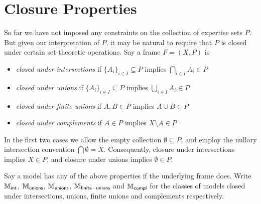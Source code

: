 \section{Closure Properties}
\label{exp_sec_closure_properties}

So far we have not imposed any constraints on the collection of expertise sets
$P$. But given our interpretation of $P$, it may be natural to
require that $P$ is closed under certain set-theoretic operations. Say
a frame $F = (X, P)$ is

\begin{itemize}

    \item \emph{closed under intersections} if $\{A_i\}_{i \in I} \subseteq P$
          implies $\bigcap_{i \in I}{A_i} \in P$

    \item \emph{closed under unions} if $\{A_i\}_{i \in I} \subseteq P$ implies
          $\bigcup_{i \in I}{A_i} \in P$

    \item \emph{closed under finite unions} if $A, B \in P$ implies $A \cup B
          \in P$

    \item \emph{closed under complements} if $A \in P$ implies $X \setminus A
          \in P$

\end{itemize}

In the first two cases we allow the empty collection $\emptyset \subseteq P$,
and employ the nullary intersection convention $\bigcap \emptyset = X$.
Consequently, closure under intersections implies $X \in P$, and closure under
unions implies $\emptyset \in P$.

Say a model has any of the above properties if the underlying frame does. Write
$\mathbb{M}_{\mathsf{int}}$, $\mathbb{M}_{\mathsf{unions}}$, $\mathbb{M}_{\mathsf{unions}}$, $\mathbb{M}_{\mathsf{finite-unions}}$ and $\mathbb{M}_{\mathsf{compl}}$ for the classes
of models closed under intersections, unions, finite unions and complements
respectively.


